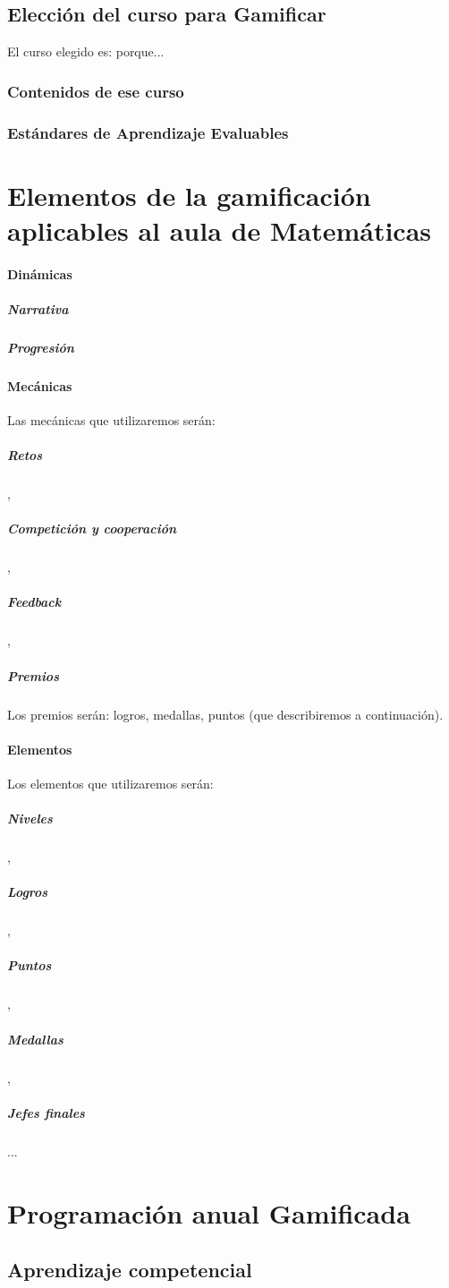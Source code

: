 \documentclass[a4paper, 12pt]{book}
\begin{document}
\subsection{Elección del curso para Gamificar}

El curso elegido es: porque...

\subsubsection{Contenidos de ese curso}
\subsubsection{Estándares de Aprendizaje Evaluables}


\section{Elementos de la gamificación aplicables al aula de Matemáticas}

\paragraph{Dinámicas}

\subparagraph{Narrativa}
\subparagraph{Progresión}

\paragraph{Mecánicas}

Las mecánicas que utilizaremos serán:
\subparagraph{Retos},
\subparagraph{Competición y cooperación},
\subparagraph{Feedback},
\subparagraph{Premios}

 Los premios serán: logros, medallas, puntos (que describiremos a continuación).

\paragraph{Elementos}

Los elementos que utilizaremos serán:
\subparagraph{Niveles},
\subparagraph{Logros},
\subparagraph{Puntos},
\subparagraph{Medallas},
\subparagraph{Jefes finales}...

\section{Programación anual Gamificada}

\subsection{Aprendizaje competencial}
\end{document}
